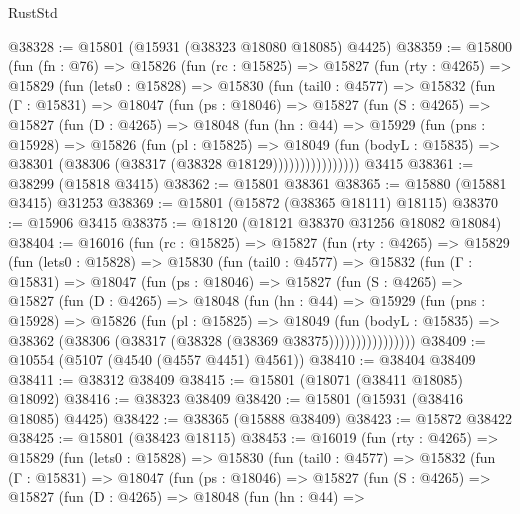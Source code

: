 \begin{lexlean}{RustStd}
\begin{coremodule}
@38328 := @15801 (@15931 (@38323 @18080 @18085) @4425)
@38359 := @15800
    (fun (fn : @76) =>
    @15826
      (fun (rc : @15825) =>
      @15827
        (fun (rty : @4265) =>
        @15829
          (fun (lets0 : @15828) =>
          @15830
            (fun (tail0 : @4577) =>
            @15832
              (fun (Γ : @15831) =>
              @18047
                (fun (ps : @18046) =>
                @15827
                  (fun (S : @4265) =>
                  @15827
                    (fun (D : @4265) =>
                    @18048
                      (fun (hn : @44) =>
                      @15929
                        (fun (pns : @15928) =>
                        @15826
                          (fun (pl : @15825) =>
                          @18049
                            (fun (bodyL : @15835) =>
                            @38301 (@38306 (@38317 (@38328 @18129))))))))))))))))
    @3415
@38361 := @38299 (@15818 @3415)
@38362 := @15801 @38361
@38365 := @15880 (@15881 @3415) @31253
@38369 := @15801 (@15872 (@38365 @18111) @18115)
@38370 := @15906 @3415
@38375 := @18120 (@18121 @38370 @31256 @18082 @18084)
@38404 := @16016
    (fun (rc : @15825) =>
    @15827
      (fun (rty : @4265) =>
      @15829
        (fun (lets0 : @15828) =>
        @15830
          (fun (tail0 : @4577) =>
          @15832
            (fun (Γ : @15831) =>
            @18047
              (fun (ps : @18046) =>
              @15827
                (fun (S : @4265) =>
                @15827
                  (fun (D : @4265) =>
                  @18048
                    (fun (hn : @44) =>
                    @15929
                      (fun (pns : @15928) =>
                      @15826
                        (fun (pl : @15825) =>
                        @18049
                          (fun (bodyL : @15835) =>
                          @38362 (@38306 (@38317 (@38328 (@38369 @38375))))))))))))))))
@38409 := @10554 (@5107 (@4540 (@4557 @4451) @4561))
@38410 := @38404 @38409
@38411 := @38312 @38409
@38415 := @15801 (@18071 (@38411 @18085) @18092)
@38416 := @38323 @38409
@38420 := @15801 (@15931 (@38416 @18085) @4425)
@38422 := @38365 (@15888 @38409)
@38423 := @15872 @38422
@38425 := @15801 (@38423 @18115)
@38453 := @16019
    (fun (rty : @4265) =>
    @15829
      (fun (lets0 : @15828) =>
      @15830
        (fun (tail0 : @4577) =>
        @15832
          (fun (Γ : @15831) =>
          @18047
            (fun (ps : @18046) =>
            @15827
              (fun (S : @4265) =>
              @15827
                (fun (D : @4265) =>
                @18048
                  (fun (hn : @44) =>

\end{coremodule}
\end{lexlean}
